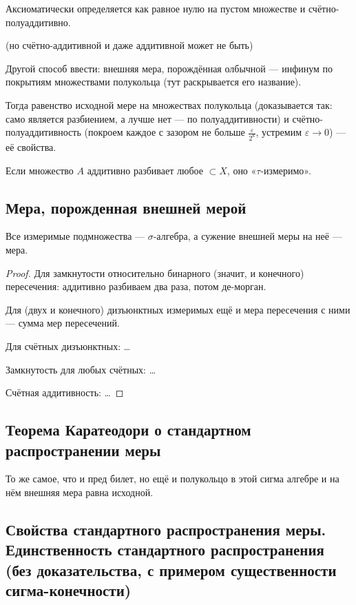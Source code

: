 \documentclass[12pt, a4paper, oneside]{memoir}
\begin{document}
Аксиоматически определяется как равное нулю на пустом множестве и счётно-полуаддитивно.

(но счётно-аддитивной и даже аддитивной может не быть)

Другой способ ввести: внешняя мера, порождённая олбычной — инфинум по покрытиям множествами полукольца (тут раскрывается его название).

Тогда равенство исходной мере на множествах полукольца (доказывается так: само является разбиением, а лучше нет — по полуаддитивности) 
и счётно-полуаддитивность (покроем каждое с зазором не больше $\frac{\varepsilon}{2^k}$, устремим $\varepsilon → 0$)
 — её свойства.

Если множество $A$ аддитивно разбивает любое $\subset X$, оно «$\tau$-измеримо».


\subsection{Мера, порожденная внешней мерой}

\begin{theorem}

    Все измеримые подмножества — $\sigma$-алгебра, а сужение внешней меры на неё — мера.

    \begin{proof}
        Для замкнутости относительно бинарного (значит, и конечного) пересечения: аддитивно разбиваем два раза, потом де-морган.

        Для (двух и конечного) дизъюнктных измеримых ещё и мера пересечения с ними — сумма мер пересечений.

        Для счётных дизъюнктных: …

        Замкнутость для любых счётных: …

        Счётная аддитивность: …
    \end{proof}
\end{theorem}




\subsection{Теорема Каратеодори о стандартном распространении меры}

То же самое, что и пред билет, но ещё и полукольцо в этой сигма алгебре и на нём внешняя мера равна исходной.

\subsection{Свойства стандартного распространения меры. 
Единственность стандартного распространения 
(без доказательства, с примером существенности сигма-конечности)}
\end{document}
